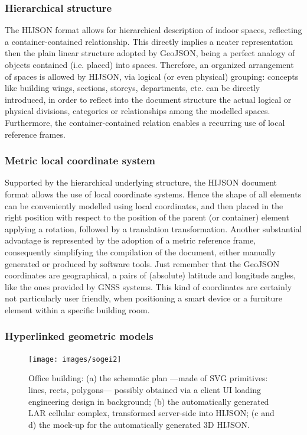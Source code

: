 \documentclass[]{egpubl}
\begin{document}
\subsubsection*{Hierarchical structure}

The HIJSON format allows for hierarchical description of indoor spaces,
reflecting a container-contained relationship. This directly implies a neater
representation then the plain linear structure adopted by GeoJSON, being a
perfect analogy of objects contained (i.e. placed) into spaces. Therefore, an
organized arrangement of spaces is allowed by HIJSON, via logical (or even
physical) grouping: concepts like building wings, sections, storeys,
departments, etc. can be directly introduced, in order to reflect into the
document structure the actual logical or physical divisions, categories or
relationships among the modelled spaces. Furthermore, the container-contained
relation enables a recurring use of local reference frames.

\subsubsection*{Metric local coordinate system}

Supported by the hierarchical underlying structure, the HIJSON document format
allows the use of local coordinate systems. Hence the shape of all elements
can be conveniently modelled using local coordinates, and then placed in the
right position with respect to the position of the parent (or container)
element applying a rotation, followed by a translation transformation. Another
substantial advantage is represented by the adoption of a metric reference
frame, consequently simplifying the compilation of the document, either
manually generated or produced by software tools. Just remember that the
GeoJSON coordinates are geographical, a pairs of (absolute) latitude and
longitude angles, like the ones provided by GNSS systems. This kind of
coordinates are certainly not particularly user friendly, when positioning a
smart device or a furniture element within a specific building room.

\subsubsection*{Hyperlinked geometric models}

\begin{figure}[h]
 \centering
 \texttt{[image: images/sogei2]} 
 \caption{Office building: 
 (a) the schematic plan ---made of SVG primitives: 
 lines, rects, polygons--- possibly obtained via a client UI 
 loading engineering design in background;
 (b) the automatically generated LAR cellular complex, transformed 
 server-side into HIJSON; 
 (c and d) the mock-up for the automatically generated 3D HIJSON.
 }
 \label{fig:sogei}
\end{figure}
\end{document}
